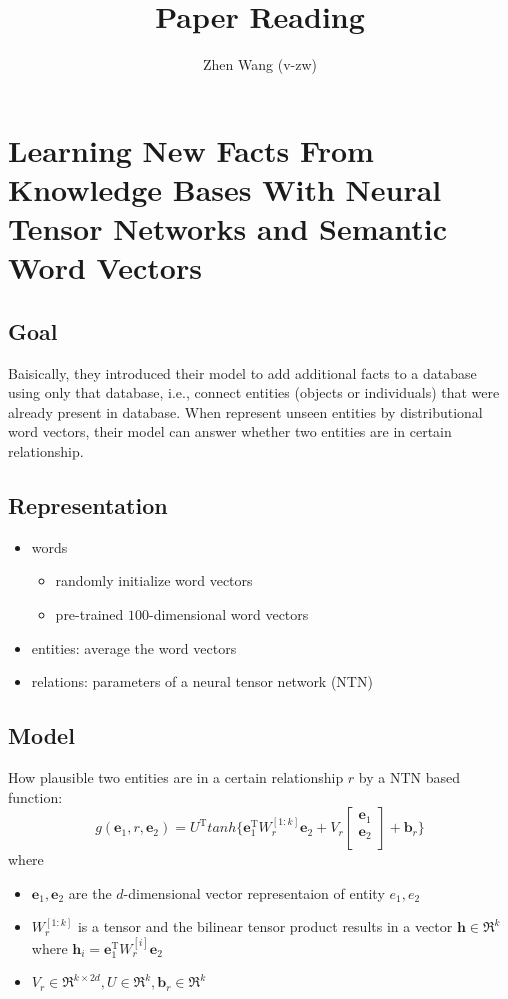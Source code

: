 \documentclass[10pt]{article} %
\title{Paper Reading}
\author{Zhen Wang (v-zw)}
\theoremstyle{definition}
\theoremstyle{definition}
\begin{document}
\maketitle
\section{Learning New Facts From Knowledge Bases With Neural Tensor Networks and Semantic Word Vectors}
\subsection{Goal}
Baisically, they introduced their model to add additional facts to a database using only that database, i.e., 
connect entities (objects or individuals) that were already present in database. 
When represent unseen entities by distributional word vectors, their model can answer whether two entities are in certain relationship. 



\subsection{Representation}
\begin{itemize}
\item words
	\begin{itemize}
	\item randomly initialize word vectors 
	\item pre-trained $100$-dimensional word vectors
	\end{itemize}
\item entities: average the word vectors 
\item relations: parameters of a neural tensor network (NTN) 
\end{itemize}



\subsection{Model} 
How plausible two entities are in a certain relationship $r$ by a NTN based function: 
\begin{equation}
g(\mathbf{e}_1, r, \mathbf{e}_2) = U^{\mathrm{T}} tanh\{\mathbf{e}_{1}^{\mathrm{T}}W_{r}^{[1:k]}\mathbf{e}_2 + V_{r}\begin{bmatrix}\mathbf{e}_{1}\\\mathbf{e}_{2}\\\end{bmatrix} + \mathbf{b}_{r}\}
\end{equation}
where 
\begin{itemize}
\item $\mathbf{e}_1, \mathbf{e}_2$ are the $d$-dimensional vector representaion of entity $e_1, e_2$
\item $W_{r}^{[1:k]}$ is a tensor and the bilinear tensor product results in a vector $\mathbf{h}\in\Re^k$ where $\mathbf{h}_{i}=\mathbf{e}_{1}^{\mathrm{T}}W_{r}^{[i]}\mathbf{e}_2$
\item $V_{r}\in\Re^{k\times 2d}, U\in\Re^{k}, \mathbf{b}_{r}\in\Re^{k}$
\end{itemize}
\end{document}
